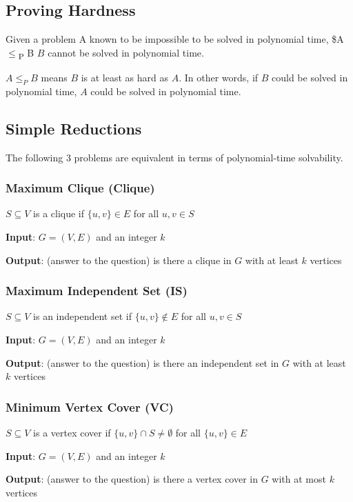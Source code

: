 \documentclass[11pt]{article}
\begin{document}
\subsection{Proving Hardness}
\label{sec:org16759e9}
Given a problem A known to be impossible to be solved in polynomial time,
\$A \(\le\)\textsubscript{P} B \implies \(B\) cannot be solved in polynomial time.

\(A \le_{P} B\) means \(B\) is at least as hard as \(A\).
In other words, if \(B\) could be solved in polynomial time, \(A\) could be solved in polynomial time.
\subsection{Simple Reductions}
\label{sec:orgc3eed1d}
The following 3 problems are equivalent in terms of polynomial-time solvability.
\subsubsection{Maximum Clique (Clique)}
\label{sec:org5b3c1de}
\(S \subseteq V\) is a clique if \(\{ u, v \} \in E\) for all \(u,v \in S\)

\textbf{Input}: \(G = (V,E)\) and an integer \(k\)

\textbf{Output}: (answer to the question) is there a clique in \(G\) with at least \(k\) vertices
\subsubsection{Maximum Independent Set (IS)}
\label{sec:orgf326c13}
\(S \subseteq V\) is an independent set if \(\{u, v\} \not\in E\) for all \(u,v \in S\)

\textbf{Input}: \(G = (V,E)\) and an integer \(k\)

\textbf{Output}: (answer to the question) is there an independent set in \(G\) with at least \(k\) vertices
\subsubsection{Minimum Vertex Cover (VC)}
\label{sec:orgfa7872d}
\(S \subseteq V\) is a vertex cover if \(\{u,v\} \cap S \ne \emptyset\) for all \(\{u,v\} \in E\)

\textbf{Input}: \(G = (V,E)\) and an integer \(k\)

\textbf{Output}: (answer to the question) is there a vertex cover in \(G\) with at most \(k\) vertices
\end{document}
